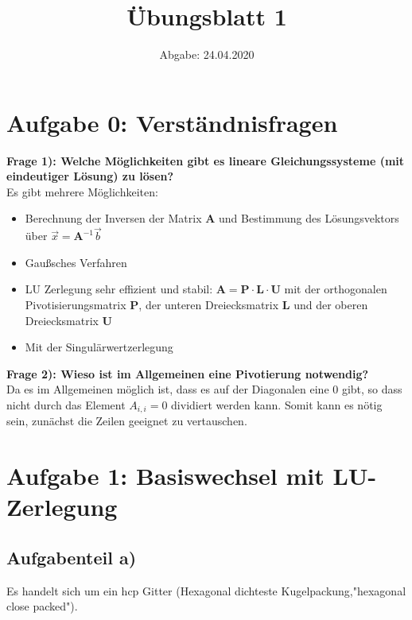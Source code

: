 

\subject{Computational Physics}
\title{Übungsblatt 1}
\date{%
  Abgabe: 24.04.2020
}



\maketitle
\thispagestyle{empty}
\newpage

\section*{Aufgabe 0: Verständnisfragen}

\textbf{Frage 1): Welche Möglichkeiten gibt es lineare Gleichungssysteme (mit eindeutiger Lösung) zu lösen?}\\

Es gibt mehrere Möglichkeiten:
\begin{itemize}
  \item Berechnung der Inversen der Matrix $\symbf{A}$ und Bestimmung des Lösungsvektors über $\vec{x}=\symbf{A}^{-1}\vec{b}$
  \item Gaußsches Verfahren
  \item LU Zerlegung \to sehr effizient und stabil: $\symbf{A}=\symbf{P}\cdot \symbf{L}\cdot \symbf{U}$ mit
  der orthogonalen Pivotisierungsmatrix $\symbf{P}$, der unteren Dreiecksmatrix $\symbf{L}$ und der
  oberen Dreiecksmatrix $\symbf{U}$
  \item Mit der Singulärwertzerlegung
\end{itemize}

\textbf{Frage 2): Wieso ist im Allgemeinen eine Pivotierung notwendig?}\\
Da es im Allgemeinen möglich ist, dass es auf der Diagonalen eine 0 gibt, so dass nicht durch das Element $A_{i,i}=0$ dividiert werden kann. Somit kann es nötig sein, zunächst die Zeilen geeignet zu vertauschen.


\section*{Aufgabe 1: Basiswechsel mit LU-Zerlegung}
\subsection*{Aufgabenteil a)}
Es handelt sich um ein hcp Gitter (Hexagonal dichteste Kugelpackung,"hexagonal close packed").
